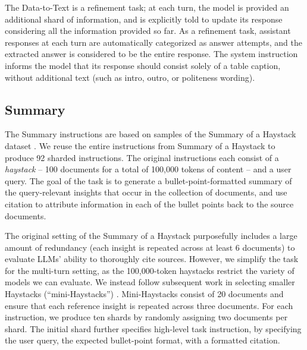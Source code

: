 \documentclass{article}
\begin{document}
\begin{appendices}
The Data-to-Text is a refinement task; at each turn, the model is provided an additional shard of information, and is explicitly told to update its response considering all the information provided so far. As a refinement task, assistant responses at each turn are automatically categorized as answer attempts, and the extracted answer is considered to be the entire response. The system instruction informs the model that its response should consist solely of a table caption, without additional text (such as intro, outro, or politeness wording).

\subsection{\texorpdfstring{\summary Summary}{Summary}}

The Summary instructions are based on samples of the Summary of a Haystack dataset \cite{laban2024summary}. We reuse the entire instructions from Summary of a Haystack to produce 92 sharded instructions. The original instructions each consist of a \textit{haystack} -- 100 documents for a total of 100,000 tokens of content -- and a user query. The goal of the task is to generate a bullet-point-formatted summary of the query-relevant insights that occur in the collection of documents, and use citation to attribute information in each of the bullet points back to the source documents.

The original setting of the Summary of a Haystack purposefully includes a large amount of redundancy (each insight is repeated across at least 6 documents) to evaluate LLMs' ability to thoroughly cite sources. However, we simplify the task for the multi-turn setting, as the 100,000-token haystacks restrict the variety of models we can evaluate. We instead follow subsequent work in selecting smaller Haystacks (``mini-Haystacks'') \cite{belem2024single}. Mini-Haystacks consist of 20 documents and ensure that each reference insight is repeated across three documents. For each instruction, we produce ten shards by randomly assigning two documents per shard. The initial shard further specifies high-level task instruction, by specifying the user query, the expected bullet-point format, with a formatted citation.


\end{appendices}
\end{document}
